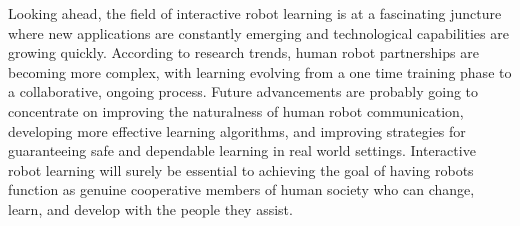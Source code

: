 \documentclass[report.tex]{subfiles}
\begin{document}
Looking ahead, the field of interactive robot learning is at a fascinating juncture where new applications are constantly emerging and technological capabilities are growing quickly. According to research trends, human robot partnerships are becoming more complex, with learning evolving from a one time training phase to a collaborative, ongoing process. Future advancements are probably going to concentrate on improving the naturalness of human robot communication, developing more effective learning algorithms, and improving strategies for guaranteeing safe and dependable learning in real world settings. Interactive robot learning will surely be essential to achieving the goal of having robots function as genuine cooperative members of human society who can change, learn, and develop with the people they assist.\\
\end{document}
